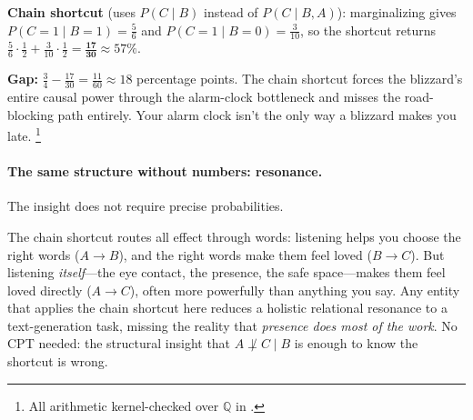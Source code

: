 \documentclass[11pt,openany]{report}
\begin{document}
\smallskip\noindent
\textbf{Chain shortcut} (uses $P(C \mid B)$ instead of $P(C \mid B, A)$):
marginalizing gives $P(C\!=\!1 \mid B\!=\!1) = \tfrac56$ and
$P(C\!=\!1 \mid B\!=\!0) = \tfrac{3}{10}$, so the shortcut returns
$\tfrac56\!\cdot\!\tfrac12 + \tfrac{3}{10}\!\cdot\!\tfrac12
= \mathbf{\tfrac{17}{30}} \approx 57\%$.

\smallskip\noindent
\textbf{Gap:} $\tfrac34 - \tfrac{17}{30} = \tfrac{11}{60} \approx 18$
percentage points.  The chain shortcut forces the blizzard's entire causal
power through the alarm-clock bottleneck and misses the road-blocking
path entirely.  Your alarm clock isn't the only way a blizzard makes you
late.%
\footnote{All arithmetic kernel-checked over $\mathbb{Q}$ in
  .}

\paragraph{The same structure without numbers: resonance.}
The insight does not require precise probabilities.

\begin{center}
\end{center}

\noindent
The chain shortcut routes all effect through words: listening helps you
choose the right words ($A \to B$), and the right words make them feel
loved ($B \to C$).  But listening \emph{itself}---the eye contact, the
presence, the safe space---makes them feel loved directly ($A \to C$),
often more powerfully than anything you say.  Any entity that applies the
chain shortcut here reduces a holistic relational resonance to a
text-generation task, missing the reality that \emph{presence does most
of the work}.  No CPT needed: the structural insight that $A \not\perp
C \mid B$ is enough to know the shortcut is wrong.
\end{document}
